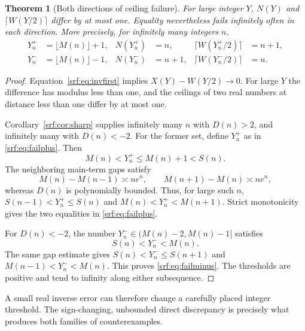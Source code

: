 \documentclass[11pt]{article}
\newtheorem{theorem}{Theorem}[section]
\theoremstyle{remark}\newtheorem{remark}[theorem]{Remark}
\begin{document}
\begin{theorem}[Both directions of ceiling failure]\label{srf:thm:failure}
For large integer $Y$, $N(Y)$ and $\lceil W(Y/2)\rceil$ differ by at most one. Equality nevertheless fails infinitely often in each direction. More precisely, for infinitely many integers $n$,
\begin{align}
 Y_n^+&=\lfloor M(n)\rfloor+1,&
 N(Y_n^+)&=n,& \lceil W(Y_n^+/2)\rceil&=n+1,\label{srf:eq:failplus}\\
 Y_n^-&=\lfloor M(n)\rfloor-1,&
 N(Y_n^-)&=n+1,& \lceil W(Y_n^-/2)\rceil&=n.\label{srf:eq:failminus}
\end{align}
\end{theorem}
\begin{proof}
Equation~\eqref{srf:eq:invfirst} implies $X(Y)-W(Y/2)\to0$. For large $Y$ the difference has modulus less than one, and the ceilings of two real numbers at distance less than one differ by at most one.

Corollary~\ref{srf:cor:sharp} supplies infinitely many $n$ with $D(n)>2$, and infinitely many with $D(n)<-2$. For the former set, define $Y_n^+$ as in \eqref{srf:eq:failplus}. Then
\[
 M(n)<Y_n^+\le M(n)+1<S(n).
\]
The neighboring main-term gaps satisfy
\[
 M(n)-M(n-1)\asymp ne^n,\qquad M(n+1)-M(n)\asymp ne^n,
\]
whereas $D(n)$ is polynomially bounded. Thus, for large such $n$, $S(n-1)<Y_n^+\le S(n)$ and $M(n)<Y_n^+<M(n+1)$. Strict monotonicity gives the two equalities in \eqref{srf:eq:failplus}.

For $D(n)<-2$, the number $Y_n^-\in(M(n)-2,M(n)-1]$ satisfies
\[
 S(n)<Y_n^-<M(n).
\]
The same gap estimate gives $S(n)<Y_n^-\le S(n+1)$ and $M(n-1)<Y_n^-<M(n)$. This proves \eqref{srf:eq:failminus}. The thresholds are positive and tend to infinity along either subsequence.
\end{proof}

A small real inverse error can therefore change a carefully placed integer threshold. The sign-changing, unbounded direct discrepancy is precisely what produces both families of counterexamples.
\end{document}
